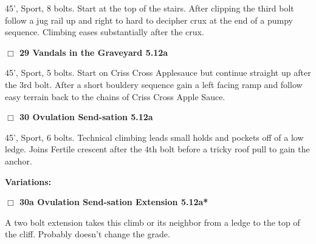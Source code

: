 \begin{multicols}{2}
\begin{adjustwidth}{1.3em}{}
45', Sport, 8 bolts. Start at the top of the stairs. After clipping the third bolt follow a jug rail up and right to hard to decipher crux at the end of a pumpy sequence. Climbing eases substantially after the crux.
\end{adjustwidth}




\needspace{2em}
\label{rt:Vandals in the Graveyard}
\colorbox{Goldenrod!20}{
\parbox{0.95\linewidth}{
\hspace{-1ex}\textbf{$\Box$
29 Vandals in the Graveyard 5.12a  
}}}
\begin{adjustwidth}{1.3em}{}			

45', Sport, 5 bolts. Start on Criss Cross Applesauce but continue straight up after the 3rd bolt. After a short bouldery sequence gain a left facing ramp and follow easy terrain back to the chains of Criss Cross Apple Sauce.
\end{adjustwidth}




\needspace{2em}
\label{rt:Ovulation Send-sation}
\colorbox{Goldenrod!20}{
\parbox{0.95\linewidth}{
\hspace{-1ex}\textbf{$\Box$
30 Ovulation Send-sation 5.12a  
}}}
\begin{adjustwidth}{1.3em}{}			

45', Sport, 6 bolts. Technical climbing leads small holds and pockets off of a low ledge. Joins Fertile crescent after the 4th bolt before a tricky roof pull to gain the anchor.
\end{adjustwidth}


\begin{adjustwidth}{0.5cm}{}				
\needspace{4em}
\textbf{Variations:} \newline

\needspace{2em}
\label{vr:Ovulation Send-sation Extension}
\colorbox{Goldenrod!20}{
\parbox{0.95\linewidth}{
\hspace{-1ex}\textbf{$\Box$
30a Ovulation Send-sation Extension 5.12a*  
}}}
\begin{adjustwidth}{1.3em}{}			

A two bolt extension takes this climb or its neighbor from a ledge to the top of the cliff. Probably doesn't change the grade.
\end{adjustwidth}



\end{adjustwidth}



\end{multicols}
